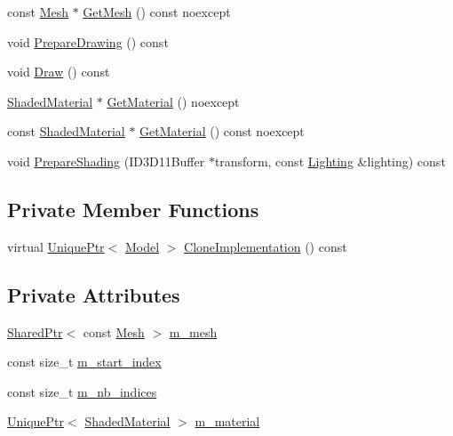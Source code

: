 \begin{DoxyCompactItemize}
const \hyperlink{classmage_1_1_mesh}{Mesh} $\ast$ \hyperlink{classmage_1_1_model_a5aba7071fb98060f9a450abad4d082cc}{Get\+Mesh} () const noexcept
\item 
void \hyperlink{classmage_1_1_model_a0083c64e8199db23b78a9281be84685f}{Prepare\+Drawing} () const
\item 
void \hyperlink{classmage_1_1_model_a13badcd5e7bfaf8fbdc447dc211d5ad9}{Draw} () const
\item 
\hyperlink{structmage_1_1_shaded_material}{Shaded\+Material} $\ast$ \hyperlink{classmage_1_1_model_aed33390bd172e034a76fa68093990174}{Get\+Material} () noexcept
\item 
const \hyperlink{structmage_1_1_shaded_material}{Shaded\+Material} $\ast$ \hyperlink{classmage_1_1_model_aa6ba2f2fbcb5aae6c1112f120e5d146c}{Get\+Material} () const noexcept
\item 
void \hyperlink{classmage_1_1_model_a14cc836651dc3eeb378d749b24c149d9}{Prepare\+Shading} (I\+D3\+D11\+Buffer $\ast$transform, const \hyperlink{structmage_1_1_lighting}{Lighting} \&lighting) const
\end{DoxyCompactItemize}
\subsection*{Private Member Functions}
\begin{DoxyCompactItemize}
\item 
virtual \hyperlink{namespacemage_a8c307fbcc33bce9b7f2aa4c26c3b95cf}{Unique\+Ptr}$<$ \hyperlink{classmage_1_1_model}{Model} $>$ \hyperlink{classmage_1_1_model_a4e32ba81c5305dd23dfe760765a5b7d2}{Clone\+Implementation} () const
\end{DoxyCompactItemize}
\subsection*{Private Attributes}
\begin{DoxyCompactItemize}
\item 
\hyperlink{namespacemage_a1e01ae66713838a7a67d30e44c67703e}{Shared\+Ptr}$<$ const \hyperlink{classmage_1_1_mesh}{Mesh} $>$ \hyperlink{classmage_1_1_model_aecd2b4031c5df30fb5f7ed6d62810f73}{m\+\_\+mesh}
\item 
const size\+\_\+t \hyperlink{classmage_1_1_model_a63a3e697c9eb1606249de15cc7b818c3}{m\+\_\+start\+\_\+index}
\item 
const size\+\_\+t \hyperlink{classmage_1_1_model_a1fcf80ed9f3002bd2319ef83f073ae75}{m\+\_\+nb\+\_\+indices}
\item 
\hyperlink{namespacemage_a8c307fbcc33bce9b7f2aa4c26c3b95cf}{Unique\+Ptr}$<$ \hyperlink{structmage_1_1_shaded_material}{Shaded\+Material} $>$ \hyperlink{classmage_1_1_model_a93e080e5dc2c7c0672a278de76899122}{m\+\_\+material}
\end{DoxyCompactItemize}



